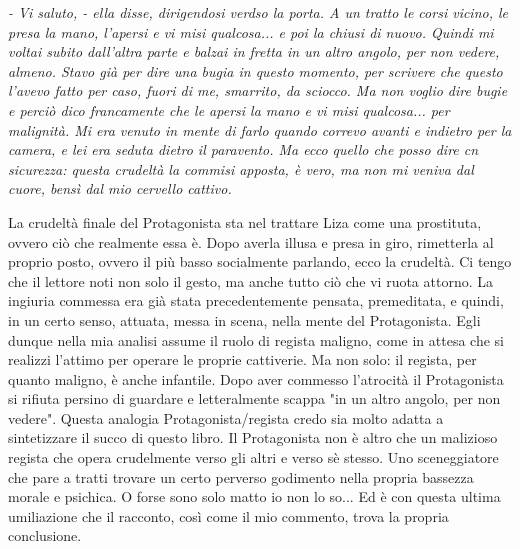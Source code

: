 \documentclass[12pt,a4paper]{report}
\theoremstyle{definition}
\theoremstyle{Theorem}
\theoremstyle{definition}
\theoremstyle{definition}
\theoremstyle{definition}
\begin{document}
\begin{center}
	\textit{- Vi saluto, - ella disse, dirigendosi verdso la porta. A un tratto le corsi vicino, le presa la mano, l'apersi e vi misi qualcosa... e poi la chiusi di nuovo. Quindi mi voltai subito dall'altra parte e balzai in fretta in  un altro angolo, per non vedere, almeno. Stavo già per dire una bugia in questo momento, per scrivere che questo l'avevo fatto per caso, fuori di me, smarrito, da sciocco. Ma non voglio dire bugie e perciò dico francamente che le apersi la mano e vi misi qualcosa... per malignità. Mi era venuto in mente di farlo quando correvo avanti e indietro per la camera, e lei era seduta dietro il paravento. Ma ecco quello che posso dire cn sicurezza: questa crudeltà la commisi apposta, è vero, ma non mi veniva dal cuore, bensì dal mio cervello cattivo.}
\end{center}
La crudeltà finale del Protagonista sta nel trattare Liza come una prostituta, ovvero ciò che realmente essa è. Dopo averla illusa e presa in giro, rimetterla al proprio posto, ovvero il più basso socialmente parlando, ecco la crudeltà. Ci tengo che il lettore noti non solo il gesto, ma anche tutto ciò che vi ruota attorno. La ingiuria commessa era già stata precedentemente pensata, premeditata, e quindi, in un certo senso, attuata, messa in scena, nella mente del Protagonista. Egli dunque nella mia analisi assume il ruolo di regista maligno, come in attesa che si realizzi l'attimo per operare le proprie cattiverie. Ma non solo: il regista, per quanto maligno, è anche infantile. Dopo aver commesso l'atrocità il Protagonista si rifiuta persino di guardare e letteralmente scappa "in un altro angolo, per non vedere". Questa analogia Protagonista/regista credo sia molto adatta a sintetizzare il succo di questo libro. Il Protagonista non è altro che un malizioso regista che opera crudelmente verso gli altri e verso sè stesso. Uno sceneggiatore che pare a tratti trovare un certo perverso godimento nella propria bassezza morale e psichica. O forse sono solo matto io non lo so...
Ed è con questa ultima umiliazione che il racconto, così come il mio commento, trova la propria conclusione.
\end{document}
